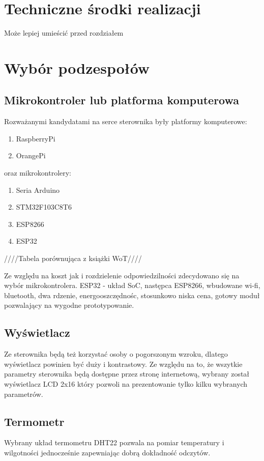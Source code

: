 \documentclass[12pt]{report}
\begin{document}
 
 \chapter{Techniczne środki realizacji}
 Może lepiej umieścić przed rozdziałem \label{rozdz.stworzenie}
 
 
 \chapter{Wybór podzespołów}
 \section{Mikrokontroler lub platforma komputerowa}
 Rozważanymi kandydatami na serce sterownika były platformy komputerowe:
 \begin{enumerate}
 \item RaspberryPi
 \item OrangePi
 \end{enumerate}
 oraz mikrokontrolery:
 \begin{enumerate}
 \item Seria Arduino
 \item STM32F103C8T6
 \item ESP8266
 \item ESP32
 \end{enumerate}
 
 ////Tabela porównująca z książki WoT////
 
 Ze względu na koszt jak i rozdzielenie odpowiedzilności zdecydowano się na wybór mikrokontrolera.
 ESP32 - układ SoC, następca ESP8266, wbudowane wi-fi, bluetooth, dwa rdzenie, energooszczędnośc, stosunkowo niska cena, gotowy moduł pozwalający na wygodne prototypowanie.
 
 \section{Wyświetlacz}
 Ze sterownika będą też korzystać osoby o pogorszonym wzroku, dlatego wyświetlacz powinien być duży i kontrastowy.
 Ze względu na to, że wszytkie parametry sterownika będą dostępne przez stronę internetową, wybrany został wyświetlacz LCD 2x16 który pozwoli na prezentowanie tylko kilku wybranych parametrów.
 
 \section{Termometr}
 Wybrany układ termometru DHT22 pozwala na pomiar temperatury i wilgotności jednocześnie zapewniając dobrą dokładność odczytów.
 
\end{document}
